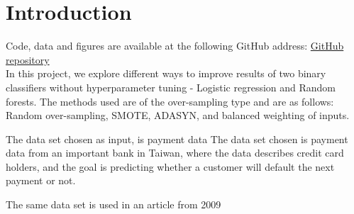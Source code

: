 \section{Introduction}
Code, data and figures are available at the following GitHub address:
\href{https://github.com/geirtul/fys-stk4155/tree/master/project3}{GitHub repository}\\

In this project, we explore different ways to improve results of two binary
classifiers without hyperparameter tuning - Logistic regression and
Random forests. The methods used are of the over-sampling type and are as
follows: Random over-sampling, SMOTE, ADASYN, and balanced weighting of
inputs.

The data set chosen as input, is payment data The data set chosen is payment
data from an important bank in Taiwan, where the data describes credit card 
holders, and the goal is predicting whether a customer will default the 
next payment or not.

The same data set is used in an article from 2009 ~\cite{ComparisonData} 






